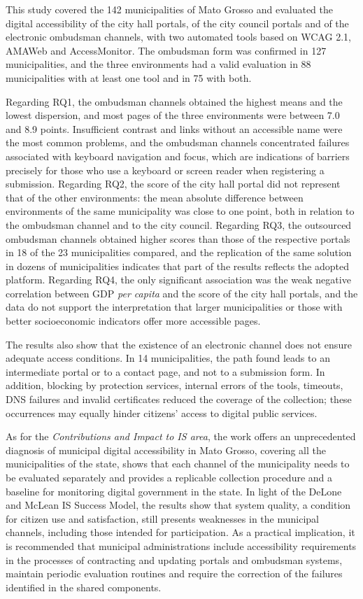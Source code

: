 \documentclass[12pt]{article}
\begin{document}
This study covered the 142 municipalities of Mato Grosso and evaluated the digital accessibility of the city hall portals, of the city council portals and of the electronic ombudsman channels, with two automated tools based on WCAG 2.1, AMAWeb and AccessMonitor. The ombudsman form was confirmed in 127 municipalities, and the three environments had a valid evaluation in 88 municipalities with at least one tool and in 75 with both.

Regarding RQ1, the ombudsman channels obtained the highest means and the lowest dispersion, and most pages of the three environments were between 7.0 and 8.9 points. Insufficient contrast and links without an accessible name were the most common problems, and the ombudsman channels concentrated failures associated with keyboard navigation and focus, which are indications of barriers precisely for those who use a keyboard or screen reader when registering a submission. Regarding RQ2, the score of the city hall portal did not represent that of the other environments: the mean absolute difference between environments of the same municipality was close to one point, both in relation to the ombudsman channel and to the city council. Regarding RQ3, the outsourced ombudsman channels obtained higher scores than those of the respective portals in 18 of the 23 municipalities compared, and the replication of the same solution in dozens of municipalities indicates that part of the results reflects the adopted platform. Regarding RQ4, the only significant association was the weak negative correlation between GDP \textit{per capita} and the score of the city hall portals, and the data do not support the interpretation that larger municipalities or those with better socioeconomic indicators offer more accessible pages.

The results also show that the existence of an electronic channel does not ensure adequate access conditions. In 14 municipalities, the path found leads to an intermediate portal or to a contact page, and not to a submission form. In addition, blocking by protection services, internal errors of the tools, timeouts, DNS failures and invalid certificates reduced the coverage of the collection; these occurrences may equally hinder citizens' access to digital public services.

As for the \textit{Contributions and Impact to IS area}, the work offers an unprecedented diagnosis of municipal digital accessibility in Mato Grosso, covering all the municipalities of the state, shows that each channel of the municipality needs to be evaluated separately and provides a replicable collection procedure and a baseline for monitoring digital government in the state. In light of the DeLone and McLean IS Success Model, the results show that system quality, a condition for citizen use and satisfaction, still presents weaknesses in the municipal channels, including those intended for participation. As a practical implication, it is recommended that municipal administrations include accessibility requirements in the processes of contracting and updating portals and ombudsman systems, maintain periodic evaluation routines and require the correction of the failures identified in the shared components.
\end{document}
